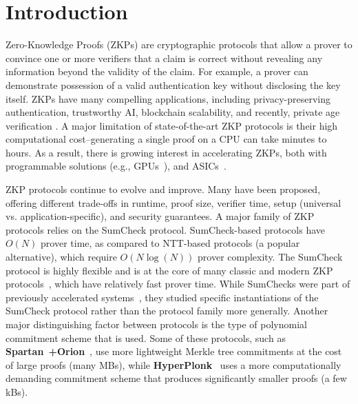 
\section{Introduction}
\label{sec:Introduction}
Zero-Knowledge Proofs (ZKPs) are cryptographic protocols that allow a prover to convince one or more verifiers that a claim is correct without revealing any information beyond the validity of the claim. For example, a prover can demonstrate possession of a valid authentication key without disclosing the key itself. 
ZKPs have many compelling applications, including privacy-preserving authentication, trustworthy AI, blockchain scalability, and recently, private age verification \cite{google_zkp}.
A major limitation of state-of-the-art ZKP protocols is their high computational cost--generating a single proof on a CPU can take minutes to hours. As a result, there is growing interest in accelerating ZKPs, both with programmable solutions (e.g., GPUs~\cite{gzkp, distmsm}), and ASICs~\cite{pipezk, szkp, rezk, nocap, zkspeed2025}.

ZKP protocols continue to evolve and improve.
Many have been proposed, offering different trade-offs in runtime, proof size, verifier time, setup (universal vs. application-specific), and security guarantees.
A major family of ZKP protocols relies on the SumCheck protocol\cite{sumcheck}. 
SumCheck-based protocols have $O(N)$ prover time, as compared to NTT-based protocols (a popular alternative\cite{groth16,gabizon2019plonk}), which require $O(N \log(N))$ prover complexity.
The SumCheck protocol is highly flexible and is at the core of many classic and modern ZKP protocols~\cite{goldwasser2015delegating,spartan,wahby2018doubly,hyperplonk,orion,whir,basefold}, which have relatively fast prover time.
 While SumChecks were part of previously accelerated systems~\cite{verifiable_asics,nocap,zkspeed2025}, they studied specific instantiations of the SumCheck protocol rather than the protocol family more generally. 
Another major distinguishing factor between protocols is the type of polynomial commitment scheme\cite{kzg_pcs} that is used. 
 Some of these protocols, such as  
\textbf{Spartan}~\cite{spartan}\textbf{+Orion}~\cite{orion}, use more lightweight Merkle tree commitments at the cost of large proofs (many MBs), while
\textbf{HyperPlonk}~\cite{hyperplonk} uses a more computationally demanding commitment scheme that produces
significantly smaller proofs (a few kBs). 

